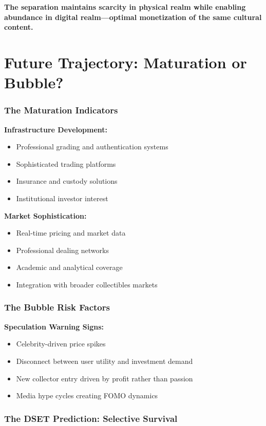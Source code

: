 \documentclass[11pt,oneside]{book}
\begin{document}
\textbf{The separation maintains scarcity in physical realm while enabling abundance in digital realm—optimal monetization of the same cultural content.}

\section{Future Trajectory: Maturation or Bubble?}

\subsubsection{The Maturation Indicators}

\textbf{Infrastructure Development:}
\begin{itemize}
\item Professional grading and authentication systems
\item Sophisticated trading platforms
\item Insurance and custody solutions
\item Institutional investor interest
\end{itemize}

\textbf{Market Sophistication:}
\begin{itemize}
\item Real-time pricing and market data
\item Professional dealing networks
\item Academic and analytical coverage
\item Integration with broader collectibles markets
\end{itemize}

\subsubsection{The Bubble Risk Factors}

\textbf{Speculation Warning Signs:}
\begin{itemize}
\item Celebrity-driven price spikes
\item Disconnect between user utility and investment demand
\item New collector entry driven by profit rather than passion
\item Media hype cycles creating FOMO dynamics
\end{itemize}

\subsubsection{The DSET Prediction: Selective Survival}
\end{document}
